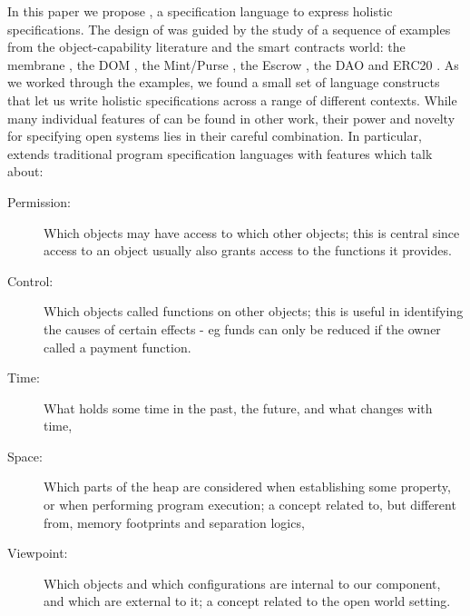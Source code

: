 In this paper we propose \Chainmail, a specification language to
express holistic specifications.
The design of \Chainmail was guided by the study of a sequence of
examples from the object-capability literature and the smart contracts world: the
membrane \cite{membranesJavascript}, the DOM \cite{dd,ddd}, the Mint/Purse \cite{MillerPhD}, the Escrow \cite{proxiesECOOP2013}, the DAO \cite{Dao,DaoBug} and
ERC20 \cite{ERC20}.  As we worked through the
examples, we found a small set of language constructs that let us
write holistic specifications across a range of different contexts.
%
While many individual features of \Chainmail can be found in other work, 
their power and novelty for specifying open systems lies in their careful combination.
In particular, \Chainmail extends 
traditional program specification languages \cite{Leavens-etal07,Meyer92} with features which talk about:
%
\begin{description}
\item[Permission: ] 
Which objects may have access to which other objects; 
this is central since access to an object usually also grants access to the functions it provides.
%
\item[Control: ]
Which objects called functions on other objects; this
 is useful in identifying the causes of certain effects - eg 
funds can only be reduced if the owner called a payment function.
%
%
\item[Time: ]
What holds some time in  the past, the future, and what changes with time,
\item[Space: ]
Which parts of the heap are considered when establishing some property, or when 
performing program execution; a concept
related to, but different from, memory footprints and separation logics,
\item[Viewpoint: ]
Which objects and which configurations are internal to our component, and which  are
external to it;
a concept related to the open world setting.
\end{description}


